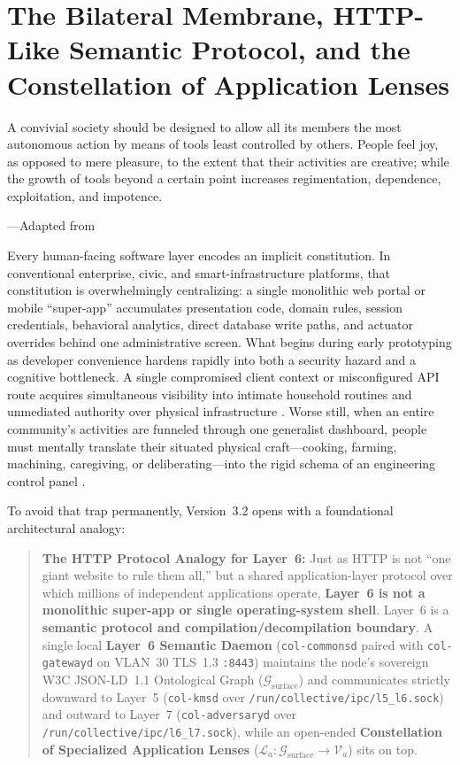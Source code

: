 \chapter{The Bilateral Membrane, HTTP-Like Semantic Protocol, and the Constellation of Application Lenses}
\label{ch:constellation-membrane}

\epigraph{A convivial society should be designed to allow all its members the most autonomous action by means of tools least controlled by others. People feel joy, as opposed to mere pleasure, to the extent that their activities are creative; while the growth of tools beyond a certain point increases regimentation, dependence, exploitation, and impotence.}{---Adapted from \textcite{illich1973}}

Every human-facing software layer encodes an implicit constitution. In conventional enterprise,
civic, and smart-infrastructure platforms, that constitution is overwhelmingly centralizing: a
single monolithic web portal or mobile ``super-app'' accumulates presentation code, domain rules,
session credentials, behavioral analytics, direct database write paths, and actuator overrides
behind one administrative screen. What begins during early prototyping as developer convenience
hardens rapidly into both a security hazard and a cognitive bottleneck. A single compromised
client context or misconfigured API route acquires simultaneous visibility into intimate
household routines and unmediated authority over physical infrastructure
\parencite{saltzer1984end,rose2020zero,zuboff2019}. Worse still, when an entire community's
activities are funneled through one generalist dashboard, people must mentally translate their
situated physical craft---cooking, farming, machining, caregiving, or deliberating---into the
rigid schema of an engineering control panel \parencite{illich1973,costanzachock2020design}.

To avoid that trap permanently, Version~3.2 opens with a foundational architectural analogy:

\begin{quote}
\textbf{The HTTP Protocol Analogy for Layer~6:} Just as HTTP is not ``one giant website to rule
them all,'' but a shared application-layer protocol over which millions of independent applications
operate, \textbf{Layer~6 is not a monolithic super-app or single operating-system shell}. Layer~6 is
a \textbf{semantic protocol and compilation/decompilation boundary}. A single local \textbf{Layer~6
Semantic Daemon} (\texttt{col-commonsd} paired with \texttt{col-gatewayd} on VLAN~30 TLS~1.3
\texttt{:8443}) maintains the node's sovereign W3C JSON-LD~1.1 Ontological Graph
($\mathcal{G}_{\mathrm{surface}}$) and communicates strictly downward to Layer~5
(\texttt{col-kmsd} over \texttt{/run/collective/ipc/l5\_l6.sock}) and outward to Layer~7
(\texttt{col-adversaryd} over \texttt{/run/collective/ipc/l6\_l7.sock}), while an open-ended
\textbf{Constellation of Specialized Application Lenses}
($\mathcal{L}_a : \mathcal{G}_{\mathrm{surface}} \to \mathcal{V}_a$) sits on top.
\end{quote}

